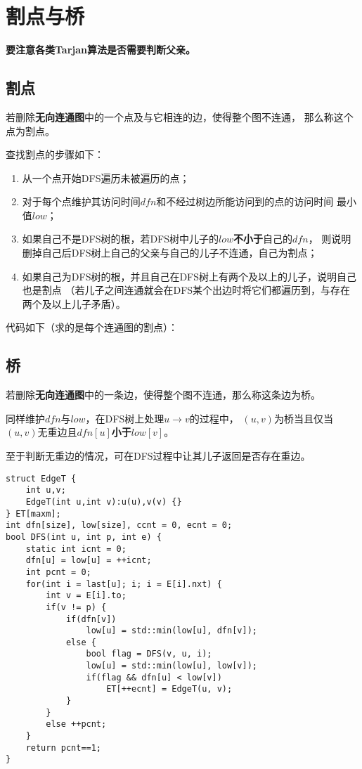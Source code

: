 \section{割点与桥}
{\bfseries 要注意各类Tarjan算法是否需要判断父亲。}
\subsection{割点}
若删除{\bfseries 无向连通图}中的一个点及与它相连的边，使得整个图不连通，
那么称这个点为割点。

查找割点的步骤如下：
\begin{enumerate}
    \item 从一个点开始DFS遍历未被遍历的点；
    \item 对于每个点维护其访问时间$dfn$和不经过树边所能访问到的点的访问时间
    最小值$low$；
    \item 如果自己不是DFS树的根，若DFS树中儿子的$low${\bfseries 不小于}自己的$dfn$，
    则说明删掉自己后DFS树上自己的父亲与自己的儿子不连通，自己为割点；
    \item 如果自己为DFS树的根，并且自己在DFS树上有两个及以上的儿子，说明自己也是割点
    （若儿子之间连通就会在DFS某个出边时将它们都遍历到，与存在两个及以上儿子矛盾）。
\end{enumerate}

代码如下（求的是每个连通图的割点）：


\subsection{桥}
若删除{\bfseries 无向连通图}中的一条边，使得整个图不连通，那么称这条边为桥。

同样维护$dfn$与$low$，在DFS树上处理$u\rightarrow v$的过程中，
$(u,v)$为桥当且仅当$(u,v)$无重边且$dfn[u]${\bfseries 小于}$low[v]$。

至于判断无重边的情况，可在DFS过程中让其儿子返回是否存在重边。

\begin{lstlisting}
struct EdgeT {
    int u,v;
    EdgeT(int u,int v):u(u),v(v) {}
} ET[maxm];
int dfn[size], low[size], ccnt = 0, ecnt = 0;
bool DFS(int u, int p, int e) {
    static int icnt = 0;
    dfn[u] = low[u] = ++icnt;
    int pcnt = 0;
    for(int i = last[u]; i; i = E[i].nxt) {
        int v = E[i].to;
        if(v != p) {
            if(dfn[v])
                low[u] = std::min(low[u], dfn[v]);
            else {
                bool flag = DFS(v, u, i);
                low[u] = std::min(low[u], low[v]);
                if(flag && dfn[u] < low[v])
                    ET[++ecnt] = EdgeT(u, v);
            }
        }
        else ++pcnt;
    }
    return pcnt==1;
}
\end{lstlisting}
